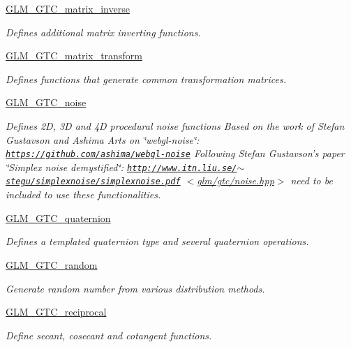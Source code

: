 \begin{DoxyCompactItemize}
\hyperlink{group__gtc__matrix__inverse}{G\-L\-M\-\_\-\-G\-T\-C\-\_\-matrix\-\_\-inverse}
\begin{DoxyCompactList}\small\item\em Defines additional matrix inverting functions. \end{DoxyCompactList}\item 
\hyperlink{group__gtc__matrix__transform}{G\-L\-M\-\_\-\-G\-T\-C\-\_\-matrix\-\_\-transform}
\begin{DoxyCompactList}\small\item\em Defines functions that generate common transformation matrices. \end{DoxyCompactList}\item 
\hyperlink{group__gtc__noise}{G\-L\-M\-\_\-\-G\-T\-C\-\_\-noise}
\begin{DoxyCompactList}\small\item\em Defines 2\-D, 3\-D and 4\-D procedural noise functions Based on the work of Stefan Gustavson and Ashima Arts on \char`\"{}webgl-\/noise\char`\"{}\-: \href{https://github.com/ashima/webgl-noise}{\tt https\-://github.\-com/ashima/webgl-\/noise} Following Stefan Gustavson's paper \char`\"{}\-Simplex noise demystified\char`\"{}\-: \href{http://www.itn.liu.se/~stegu/simplexnoise/simplexnoise.pdf}{\tt http\-://www.\-itn.\-liu.\-se/$\sim$stegu/simplexnoise/simplexnoise.\-pdf} $<$\hyperlink{noise_8hpp}{glm/gtc/noise.\-hpp}$>$ need to be included to use these functionalities. \end{DoxyCompactList}\item 
\hyperlink{group__gtc__quaternion}{G\-L\-M\-\_\-\-G\-T\-C\-\_\-quaternion}
\begin{DoxyCompactList}\small\item\em Defines a templated quaternion type and several quaternion operations. \end{DoxyCompactList}\item 
\hyperlink{group__gtc__random}{G\-L\-M\-\_\-\-G\-T\-C\-\_\-random}
\begin{DoxyCompactList}\small\item\em Generate random number from various distribution methods. \end{DoxyCompactList}\item 
\hyperlink{group__gtc__reciprocal}{G\-L\-M\-\_\-\-G\-T\-C\-\_\-reciprocal}
\begin{DoxyCompactList}\small\item\em Define secant, cosecant and cotangent functions. \end{DoxyCompactList}\item 

\end{DoxyCompactItemize}
